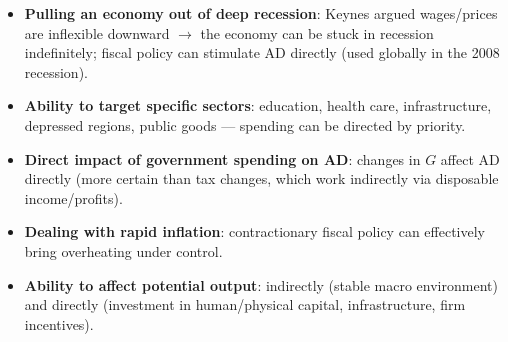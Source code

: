 \documentclass[a4paper,12pt]{article}
\begin{document}
\begin{itemize}
  \item \textbf{Pulling an economy out of deep recession}: Keynes argued wages/prices are inflexible downward $\to$ the economy can be stuck in recession indefinitely; fiscal policy can stimulate AD directly (used globally in the 2008 recession).
  \item \textbf{Ability to target specific sectors}: education, health care, infrastructure, depressed regions, public goods --- spending can be directed by priority.
  \item \textbf{Direct impact of government spending on AD}: changes in $G$ affect AD directly (more certain than tax changes, which work indirectly via disposable income/profits).
  \item \textbf{Dealing with rapid inflation}: contractionary fiscal policy can effectively bring overheating under control.
  \item \textbf{Ability to affect potential output}: indirectly (stable macro environment) and directly (investment in human/physical capital, infrastructure, firm incentives).
\end{itemize}
\end{document}
